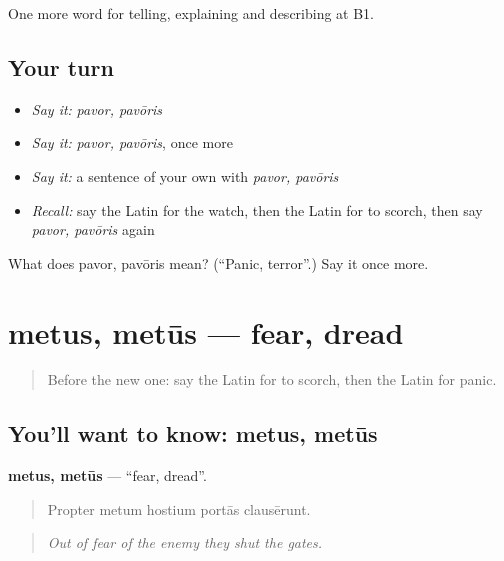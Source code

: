 \begin{grammarlens}[title={What you've built}]
One more word for telling, explaining and describing at B1.
\end{grammarlens}

\subsection*{Your turn}
\begin{itemize}
\raggedright
  \item \emph{Say it:} \emph{pavor, pavōris}
  \item \emph{Say it:} \emph{pavor, pavōris}, once more
  \item \emph{Say it:} a sentence of your own with \emph{pavor, pavōris}
  \item \emph{Recall:} say the Latin for the watch, then the Latin for to scorch, then say \emph{pavor, pavōris} again
\end{itemize}

\begin{tcolorbox}[breakable,colback=teal!4,colframe=teal!35!black,title={Before you move on}]
What does pavor, pavōris mean? (\textquotedblleft{}Panic, terror\textquotedblright{}.) Say it once more.
\end{tcolorbox}
\section[metus, metūs]{metus, metūs — fear, dread}

\label{lesson:LA-C320-metus}



\begin{quote}
Before the new one: say the Latin for to scorch, then the Latin for panic.
\end{quote}

\subsection*{You'll want to know: metus, metūs}
\textbf{metus, metūs} — \textquotedblleft{}fear, dread\textquotedblright{}.

\begin{quote}
Propter metum hostium portās clausērunt.
\end{quote}

\begin{quote}
\emph{Out of fear of the enemy they shut the gates.}
\end{quote}

